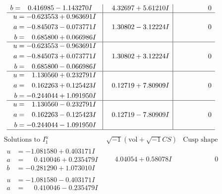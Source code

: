 \documentclass[1p]{elsarticle_modified}
\theoremstyle{definition}
\newcommand{\I}{\sqrt{-1}}
\begin{document}
$$\begin{array}{c|c|c}
\begin{aligned}
b &= \phantom{-}0.416985 - 1.143270 I\end{aligned}
 & \phantom{-}4.32697 + 5.61210 I & \phantom{-0.000000 } 0 \\ \hline\begin{aligned}
u &= -0.623553 + 0.963691 I \\
a &= -0.845073 - 0.073771 I \\
b &= \phantom{-}0.685800 + 0.066986 I\end{aligned}
 & \phantom{-}1.30802 - 3.12224 I & \phantom{-0.000000 } 0 \\ \hline\begin{aligned}
u &= -0.623553 - 0.963691 I \\
a &= -0.845073 + 0.073771 I \\
b &= \phantom{-}0.685800 - 0.066986 I\end{aligned}
 & \phantom{-}1.30802 + 3.12224 I & \phantom{-0.000000 } 0 \\ \hline\begin{aligned}
u &= \phantom{-}1.130560 + 0.232791 I \\
a &= \phantom{-}0.162263 + 0.125423 I \\
b &= -0.244044 + 1.091950 I\end{aligned}
 & \phantom{-}0.12719 + 7.80909 I & \phantom{-0.000000 } 0 \\ \hline\begin{aligned}
u &= \phantom{-}1.130560 - 0.232791 I \\
a &= \phantom{-}0.162263 - 0.125423 I \\
b &= -0.244044 - 1.091950 I\end{aligned}
 & \phantom{-}0.12719 - 7.80909 I & \phantom{-0.000000 } 0\\
 \hline 
 \end{array}$$\newpage$$\begin{array}{c|c|c}  
\text{Solutions to }I^u_{1}& \I (\text{vol} + \sqrt{-1}CS) & \text{Cusp shape}\\
 \hline 
\begin{aligned}
u &= -1.081580 + 0.403171 I \\
a &= \phantom{-}0.410046 + 0.235479 I \\
b &= -0.281290 + 1.073010 I\end{aligned}
 & \phantom{-}4.04054 + 0.58078 I & \phantom{-0.000000 } 0 \\ \hline\begin{aligned}
u &= -1.081580 - 0.403171 I \\
a &= \phantom{-}0.410046 - 0.235479 I \\

\end{aligned}
\end{array}$$
\end{document}
